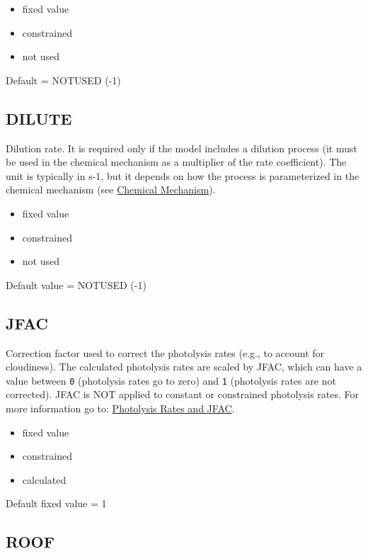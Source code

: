 \begin{itemize}
\item fixed value
\item constrained
\item not used
\end{itemize}

Default = NOTUSED (-1)

\subsection{DILUTE} \label{subsec:dilute}

Dilution rate. It is required only if the model includes a dilution
process (it must be used in the chemical mechanism as a multiplier of
the rate coefficient). The unit is typically in s-1, but it depends on
how the process is parameterized in the chemical mechanism (see
\hyperref[sec:chemical-mechanism]{Chemical Mechanism}).

\begin{itemize}
\item fixed value
\item constrained
\item not used
\end{itemize}

Default value = NOTUSED (-1)

\subsection{JFAC} \label{subsec:jfac}

Correction factor used to correct the photolysis rates (e.g., to
account for cloudiness). The calculated photolysis rates are scaled by
JFAC, which can have a value between \texttt{0} (photolysis rates go
to zero) and \texttt{1} (photolysis rates are not corrected). JFAC is
NOT applied to constant or constrained photolysis rates. For more
information go to: \hyperref[sec:photolysis-rates]{Photolysis Rates and
  JFAC}.

\begin{itemize}
\item fixed value
\item constrained
\item calculated
\end{itemize}

Default fixed value = 1

\subsection{ROOF} \label{subsec:roof}

